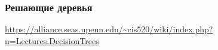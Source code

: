 \documentclass{beamer}
\begin{document}
\begin{frame}\frametitle{Решающие деревья}
    \begin{figure}[t]
      \centering
      \hfill
    \end{figure}


\vfill\vfill\vfill
{\tiny \color{gray} \url{https://alliance.seas.upenn.edu/~cis520/wiki/index.php?n=Lectures.DecisionTrees}}

\end{frame}


\end{document}
